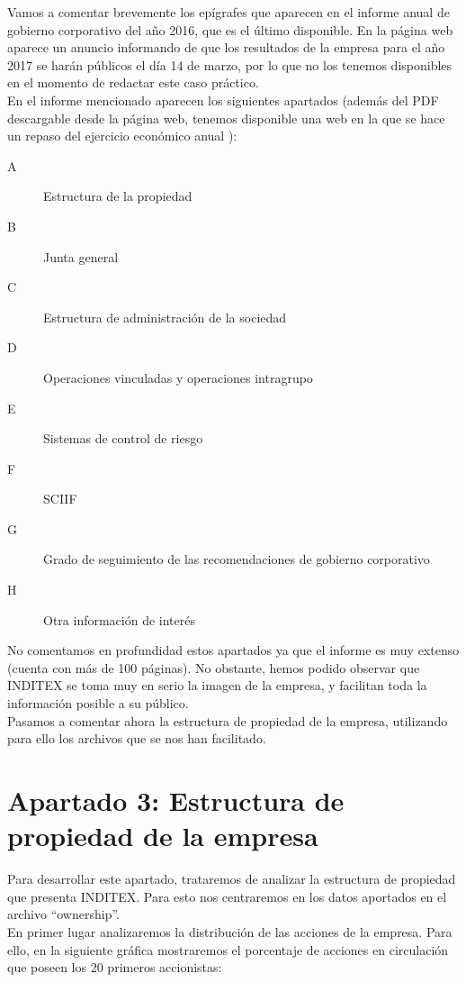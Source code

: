 \documentclass[11pt]{article}
\theoremstyle{plain}
\theoremstyle{definition}
\begin{document}
Vamos a comentar brevemente los epígrafes que aparecen en el informe
anual de gobierno corporativo del año 2016, que es el último
disponible.  En la página web aparece un anuncio informando de que los
resultados de la empresa para el año 2017 se harán públicos el día 14
de marzo, por lo que no los tenemos disponibles en el momento de
redactar este
caso práctico.\\

En el informe mencionado aparecen los siguientes apartados (además del
PDF descargable desde la página web, tenemos disponible una web en la
que se hace un repaso del ejercicio económico anual
\cite{annual-report}):

\begin{description}
\item[A] Estructura de la propiedad
\item[B] Junta general
\item[C] Estructura de administración de la sociedad
\item[D] Operaciones vinculadas y operaciones intragrupo
\item[E] Sistemas de control de riesgo
\item[F] SCIIF
\item[G] Grado de seguimiento de las recomendaciones de gobierno
  corporativo
\item[H] Otra información de interés
\end{description}

No comentamos en profundidad estos apartados ya que el informe es muy
extenso (cuenta con más de 100 páginas). No obstante, hemos podido
observar que INDITEX se toma muy en serio la imagen de la empresa,
y facilitan toda la información posible a su público.\\

Pasamos a comentar ahora la estructura de propiedad de la empresa,
utilizando para ello los archivos que se nos han facilitado.

\section*{Apartado 3: Estructura de propiedad de la empresa}

Para desarrollar este apartado, trataremos de analizar la estructura
de propiedad que presenta INDITEX. Para esto nos centraremos en los
datos aportados en el archivo ``ownership''.\\

En primer lugar analizaremos la distribución de las acciones de la
empresa.  Para ello, en la siguiente gráfica mostraremos el porcentaje
de acciones en circulación que poseen los 20 primeros accionistas:
\end{document}
